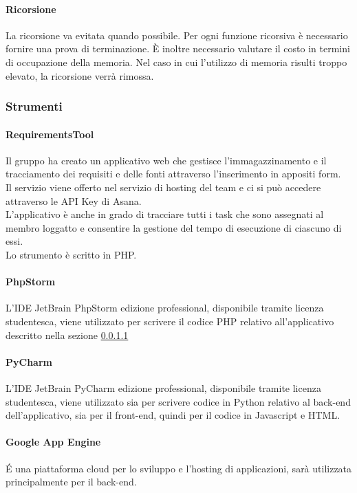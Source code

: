 			\paragraph{Ricorsione} %
			\label{par:ricorsione}
			La ricorsione va evitata quando possibile. Per ogni funzione ricorsiva è necessario fornire una prova di terminazione. È inoltre necessario valutare il costo in termini di occupazione della memoria. Nel caso in cui l’utilizzo di memoria risulti troppo elevato, la ricorsione verrà rimossa.
		
		\subsubsection{Strumenti}
		
			\paragraph{RequirementsTool}
			\label{par:requirements_tool}
			Il gruppo ha creato un applicativo web che gestisce l'immagazzinamento e il tracciamento dei requisiti e delle fonti attraverso l'inserimento in appositi form. \\
			Il servizio viene offerto nel servizio di hosting del team e ci si può accedere attraverso le API Key di Asana. \\
			L'applicativo è anche in grado di tracciare tutti i task che sono assegnati al membro loggatto e consentire la gestione del tempo di esecuzione di ciascuno di essi. \\
			Lo strumento è scritto in PHP.
			
			\paragraph{PhpStorm} %
			\label{par:php_storm}
			L'IDE JetBrain PhpStorm edizione professional, disponibile tramite licenza studentesca, viene utilizzato per scrivere il codice PHP relativo all'applicativo descritto nella sezione \ref{par:requirements_tool}
			\paragraph{PyCharm}
			L'IDE JetBrain PyCharm edizione professional, disponibile tramite licenza studentesca, viene utilizzato sia per scrivere codice in Python relativo al back-end dell'applicativo, sia per il front-end, quindi per il codice in Javascript e HTML.
			\paragraph{Google App Engine}
			\'E una piattaforma cloud per lo sviluppo e l'hosting di applicazioni, sarà utilizzata principalmente per il back-end.
			 